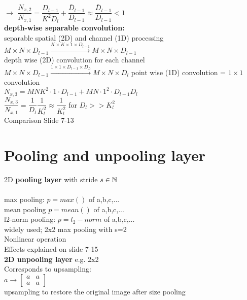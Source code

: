 $ \rightarrow $ $ \dfrac{N_{x,2}}{N_{x,1}} = \dfrac{D_{l-1}}{K^2 D_l} + \dfrac{\bar{D}_{l-1}}{D_{l-1}} \approx \dfrac{\bar{D}_{l-1}}{D_{l-1}} < 1 $\\
\textbf{\textbullet depth-wise separable convolution:}\\
separable spatial (2D) and channel (1D) processing \\
\textbullet $ M \times N \times D_{l-1} \overset{K \times K \times 1 \times D_{l-1} }{\longrightarrow} M \times N \times D_{l-1}  $ \\
depth wise (2D) convolution for each channel \\
\textbullet $  M \times N \times D_{l-1} \overset {1 \times 1 \times D_{l-1} \times D_L}{\longrightarrow} M \times N \times D_l  $ point wise (1D) convolution = $  1 \times 1  $ convolution \\
$  N_{x,3 } = MNK^2 \cdot 1 \cdot D_{l-1 } + MN \cdot 1^2 \cdot D_{l-1 } D_l  $\\
$  \dfrac{N_{x,3}}{N_{x,1} } = \dfrac{1}{D_l } \dfrac{1}{K_l^2} \approx \dfrac{1}{K_l^2}  $ for $  D_l >> K_l ^2 $\\
\textbullet Comparison Slide 7-13
\section{Pooling and unpooling layer}
2D \textbf{pooling layer} with  stride $  s \in \mathbb N $\\
\\
\textbullet max pooling: $ p = max() $ of a,b,c,...\\
\textbullet mean pooling $ p= mean () $ of a,b,c,...\\
\textbullet l2-norm pooling: $ p= l_2-norm $ of a,b,c,...\\
widely used; 2x2 max pooling with s=2 \\
Nonlinear operation\\
Effects explained on slide 7-15\\
\textbf{2D unpooling layer} e.g. 2x2 \\
Corresponds to upsampling:\\
$ a \rightarrow \left[ 
\begin{matrix}
	a & a\\
	a & a 
\end{matrix}
\right] $\\
upsampling to restore the original image after size pooling
